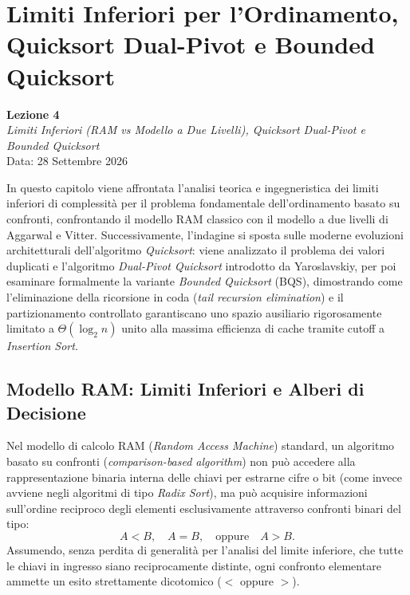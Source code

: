 \chapter{Limiti Inferiori per l'Ordinamento, Quicksort Dual-Pivot e Bounded Quicksort}
\label{cha:lecture-four}

\begin{center}
  \textbf{Lezione 4}\\
  \emph{Limiti Inferiori (RAM vs Modello a Due Livelli), Quicksort Dual-Pivot e Bounded Quicksort}\\[0.5em]
  Data: 28 Settembre 2026
\end{center}

In questo capitolo viene affrontata l'analisi teorica e ingegneristica dei limiti inferiori di complessità per il problema fondamentale dell'ordinamento basato su confronti, confrontando il modello RAM classico con il modello a due livelli di Aggarwal e Vitter. Successivamente, l'indagine si sposta sulle moderne evoluzioni architetturali dell'algoritmo \textit{Quicksort}: viene analizzato il problema dei valori duplicati e l'algoritmo \textit{Dual-Pivot Quicksort} introdotto da Yaroslavskiy, per poi esaminare formalmente la variante \textit{Bounded Quicksort} (BQS), dimostrando come l'eliminazione della ricorsione in coda (\textit{tail recursion elimination}) e il partizionamento controllato garantiscano uno spazio ausiliario rigorosamente limitato a $\Theta(\log_2 n)$ unito alla massima efficienza di cache tramite cutoff a \textit{Insertion Sort}.

\FloatBarrier
\section{Modello RAM: Limiti Inferiori e Alberi di Decisione}
\label{sec:ram-lower-bounds}

Nel modello di calcolo RAM (\textit{Random Access Machine}) standard, un algoritmo basato su confronti (\textit{comparison-based algorithm}) non può accedere alla rappresentazione binaria interna delle chiavi per estrarne cifre o bit (come invece avviene negli algoritmi di tipo \textit{Radix Sort}), ma può acquisire informazioni sull'ordine reciproco degli elementi esclusivamente attraverso confronti binari del tipo:
\begin{equation}
  A < B, \quad A = B, \quad \text{oppure} \quad A > B.
\end{equation}
Assumendo, senza perdita di generalità per l'analisi del limite inferiore, che tutte le chiavi in ingresso siano reciprocamente distinte, ogni confronto elementare ammette un esito strettamente dicotomico ($<$ oppure $>$).

